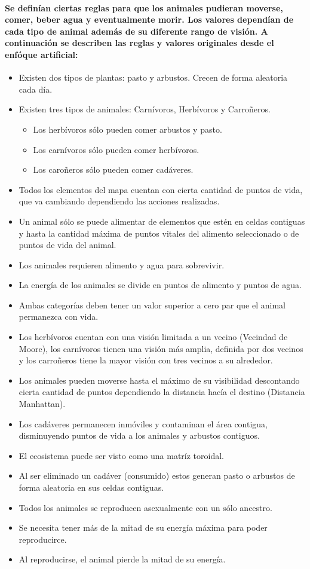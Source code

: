   \paragraph{Se definían ciertas reglas para que los animales pudieran moverse, comer, beber agua y eventualmente morir. Los valores dependían de cada tipo de animal además de su diferente rango de visión. A continuación se describen las reglas y valores originales desde el enfóque artificial:}
  \begin{itemize}
    \item{Existen dos tipos de plantas: pasto y arbustos. Crecen de forma aleatoria cada día.}
    \item{Existen tres tipos de animales: Carnívoros, Herbívoros y Carroñeros.}
      \begin{itemize}
        \item{Los herbívoros sólo pueden comer arbustos y pasto.}
        \item{Los carnívoros sólo pueden comer herbívoros.}
        \item{Los caroñeros sólo pueden comer cadáveres.}
      \end{itemize}
    \item{Todos los elementos del mapa cuentan con cierta cantidad de puntos de vida, que va cambiando dependiendo las acciones realizadas.}
    \item{Un animal sólo se puede alimentar de elementos que estén en celdas contiguas y hasta la cantidad máxima de puntos vitales del alimento seleccionado o de puntos de vida del animal.}
    \item{Los animales requieren alimento y agua para sobrevivir.}
    \item{La energía de los animales se divide en puntos de alimento y puntos de agua.}
    \item{Ambas categorías deben tener un valor superior a cero par que el animal permanezca con vida.}
    \item{Los herbívoros cuentan con una visión limitada a un vecino (Vecindad de Moore), los carnívoros tienen una visión más amplia, definida por dos vecinos y los carroñeros tiene la mayor visión con tres vecinos a su alrededor.}
    \item{Los animales pueden moverse hasta el máximo de su visibilidad descontando cierta cantidad de puntos dependiendo la distancia hacía el destino (Distancia Manhattan).}
    \item{Los cadáveres permanecen inmóviles y contaminan el área contigua, disminuyendo puntos de vida a los animales y arbustos contiguos.}
    \item{El ecosistema puede ser visto como una matríz toroidal.}
    \item{Al ser eliminado un cadáver (consumido) estos generan pasto o arbustos de forma aleatoria en sus celdas contiguas.}
    \item{Todos los animales se reproducen asexualmente con un sólo ancestro.}
    \item{Se necesita tener más de la mitad de su energía máxima para poder reproducirce.}
    \item{Al reproducirse, el animal pierde la mitad de su energía.}
  \end{itemize}
